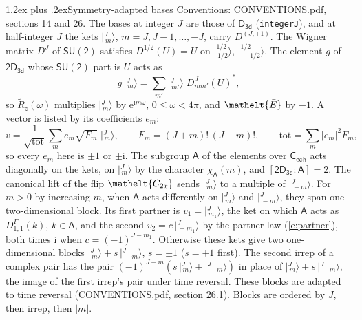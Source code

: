 \documentclass[10pt,a4paper]{article}
\makeatletter
\renewcommand\section{\@startsection{section}{1}{\z@}{-3ex plus -1ex minus -.2ex}%
  {1.2ex plus .2ex}{\normalfont\large\sffamily\bfseries\color{parttitle}}}
\numberwithin{equation}{section}
\newcommand{\eltfont}[1]{{\let\sigma\eltsigma\mathelt{#1}}}
\newcommand{\grp}[1]{\mathsf{#1}}
\newcommand{\elt}[1]{\eltfont{#1}}
\newcommand{\grpindex}[2]{[#1 : #2]}
\newcommand{\iunit}{\mathrm{i}}
\newcommand{\expe}{\mathrm{e}}
\newcommand{\irrJp}[2]{D^{(#1,#2)}}
\newcommand{\repD}[1]{D^{#1}}
\newcommand{\wignerD}[1]{D^{#1}}
\newcommand{\chiA}{\chi_{\grp{A}}}
\newcommand{\conj}[1]{{#1}^{*}}
\newcommand{\jm}[2]{\bigl\lvert{}^{#1}_{\,#2}\bigr\rangle}
\newcommand{\barred}[1]{\bar{#1}}
\newcommand{\lift}[1]{\tilde{#1}}
\makeatother
\begin{document}
\section{Symmetry-adapted bases}\label{s:bases}
Conventions: \href{../../CONVENTIONS.pdf}{CONVENTIONS.pdf}, sections \href{../../../rotation/CONVENTIONS.pdf\#conv.14}{14} and \href{../../CONVENTIONS.pdf\#conv.26}{26}.
\leavevmode\label{n:index.m}\label{n:vector.ket}The bases at integer $J$ are those of \href{../../../rotation/data/pdf/D3d.pdf}{$\grp{D_{3d}}$} (\texttt{integerJ}), and at half-integer $J$ the kets $\jm{J}{m}$, $m = J, J-1, \dots, -J$, carry $\irrJp{J}{+1}$. \label{n:matrix.wigner}The Wigner matrix $\wignerD{J}$ of $\grp{SU(2)}$ satisfies $\wignerD{1/2}(U) = U$ on $\jm{1/2}{1/2}$, $\jm{1/2}{-1/2}$. The element $g$ of $\grp{2D_{3d}}$ whose $\grp{SU(2)}$ part is $U$ acts as
\begin{equation}\label{e:action}g\,\jm{J}{m} = \sum_{m'} \jm{J}{m'}\; \conj{\wignerD{J}_{m m'}(U)},\end{equation}
so $\lift{R}_{z}(\omega)$ multiplies $\jm{J}{m}$ by $\expe^{\iunit m\omega}$, $0 \le \omega < 4\pi$, and $\elt{\barred{E}}$ by $-1$. \label{n:index.ketcoefficient}\label{n:vector.basis.symmetry}\label{n:index.ketweight}\label{n:index.total}A vector is listed by its coefficients $e_m$:
\begin{equation}\label{e:ket}v = \frac{1}{\sqrt{\mathrm{tot}}}\sum_m e_m\sqrt{F_m}\;\jm{J}{m},\qquad F_m = (J+m)!\,(J-m)!,\qquad \mathrm{tot} = \sum_m |e_m|^2F_m,\end{equation}
so every $e_m$ here is $\pm 1$ or $\pm\iunit$.
\leavevmode\label{n:group.A}\label{n:function.character.abelian}The subgroup $\grp{A}$ of the elements over $\grp{C_{\infty h}}$ acts diagonally on the kets, on $\jm{J}{m}$ by the character $\chiA(m)$, and $\grpindex{\grp{2D_{3d}}}{\grp{A}} = 2$. The canonical lift of the flip $\elt{C_{2x}}$ sends $\jm{J}{m}$ to a multiple of $\jm{J}{-m}$. For $m > 0$ by increasing $m$, when $\grp{A}$ acts differently on $\jm{J}{m}$ and $\jm{J}{-m}$, they span one two-dimensional block. \label{n:index.partner.sign}Its first partner is $v_1 = \jm{J}{m_1}$, the ket on which $\grp{A}$ acts as $\repD{\Gamma}_{1,1}(k)$, $k \in \grp{A}$, and the second $v_2 = c\,\jm{J}{-m_1}$ by the partner law (\ref{e:partner}), both times $\iunit$ when $c = (-1)^{J-m_1}$. \label{n:index.pair.sign}Otherwise these kets give two one-dimensional blocks $\jm{J}{m} + s\,\jm{J}{-m}$, $s = \pm 1$ ($s = +1$ first). The second irrep of a complex pair has the pair $(-1)^{J-m}(s\,\jm{J}{m} + \jm{J}{-m})$ in place of $\jm{J}{m} + s\,\jm{J}{-m}$, the image of the first irrep's pair under time reversal. These blocks are adapted to time reversal (\href{../../CONVENTIONS.pdf}{CONVENTIONS.pdf}, section \href{../../CONVENTIONS.pdf\#conv.26.1}{26.1}). Blocks are ordered by $J$, then irrep, then $|m|$.
\end{document}
